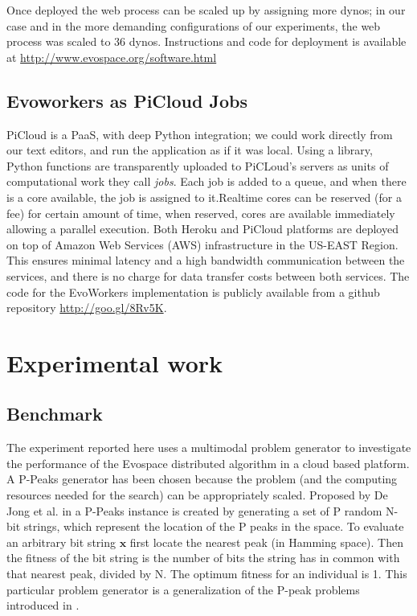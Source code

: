 \documentclass{llncs}
\begin{document}
Once deployed the web process can be scaled up by assigning more dynos;
in our case and in the more demanding configurations of our experiments, 
the web process was scaled to 36 dynos. Instructions and code for deployment 
is available at \url{http://www.evospace.org/software.html}
\subsection{Evoworkers as PiCloud Jobs}
PiCloud is a PaaS, with deep Python integration; we could work directly 
from our text editors, and run the application as if it was local. 
Using a library, Python functions are transparently uploaded to PiCLoud's 
servers as units of computational work they call \emph{jobs}. 
Each job is added to a queue, and when there is a core available, 
the job is assigned to it.Realtime cores can be reserved (for a fee) 
for certain amount of time, when reserved, cores are available 
immediately allowing a parallel execution. Both Heroku and PiCloud 
platforms are deployed  on top of Amazon Web Services (AWS) 
infrastructure in the US-EAST Region. This ensures minimal 
latency and a high bandwidth communication between the services, 
and there is no charge for data transfer costs between both services. 
The code for the EvoWorkers implementation is publicly available 
from a github repository \url{http://goo.gl/8Rv5K}.

\section{Experimental work}
\subsection{Benchmark}
\label{ss:benchmark}
The experiment reported here uses a multimodal problem generator to
investigate the performance of the Evospace distributed algorithm in a
cloud based platform. A P-Peaks generator has been chosen because the problem
(and the computing resources needed for the search) can be appropriately scaled.
Proposed by De Jong et al. in \cite{Jong:PS97} a
P-Peaks instance is created by generating a set of P random N-bit
strings, which represent the location of the P peaks in the space. To
evaluate an arbitrary bit string \begin{math} \mathbf{x} \end{math}
first locate the nearest peak (in Hamming space). Then the fitness of
the bit string is the number of bits the string has in common with
that nearest peak, divided by N. The optimum fitness for an individual
is 1. This particular problem generator is a generalization of the
P-peak problems introduced in \cite{Jong:1990}.             %
\end{document}
